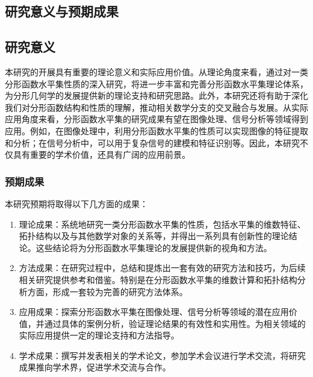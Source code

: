 \subsection{研究意义与预期成果}

\subsection{研究意义}

本研究的开展具有重要的理论意义和实际应用价值。从理论角度来看，通过对一类分形函数水平集性质的深入研究，将进一步丰富和完善分形函数水平集理论体系，为分形几何学的发展提供新的理论支持和研究思路。此外，本研究还将有助于深化我们对分形函数结构和性质的理解，推动相关数学分支的交叉融合与发展。从实际应用角度来看，分形函数水平集的研究成果有望在图像处理、信号分析等领域得到应用。例如，在图像处理中，利用分形函数水平集的性质可以实现图像的特征提取和分析；在信号分析中，可以用于复杂信号的建模和特征识别等。因此，本研究不仅具有重要的学术价值，还具有广阔的应用前景。

\subsubsection{预期成果}

本研究预期将取得以下几方面的成果：

\begin{enumerate}
      \item 理论成果：系统地研究一类分形函数水平集的性质，包括水平集的维数特征、拓扑结构以及与其他数学对象的关系等，并得出一系列具有创新性的理论结论。这些结论将为分形函数水平集理论的发展提供新的视角和方法。
      \item 方法成果：在研究过程中，总结和提炼出一套有效的研究方法和技巧，为后续相关研究提供参考和借鉴。特别是在分形函数水平集的维数计算和拓扑结构分析方面，形成一套较为完善的研究方法体系。
      \item 应用成果：探索分形函数水平集在图像处理、信号分析等领域的潜在应用价值，并通过具体的案例分析，验证理论结果的有效性和实用性。为相关领域的实际应用提供一定的理论支持和方法指导。
      \item 学术成果：撰写并发表相关的学术论文，参加学术会议进行学术交流，将研究成果推向学术界，促进学术交流与合作。
\end{enumerate}